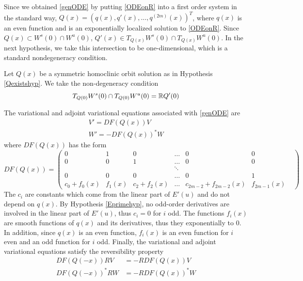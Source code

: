 \documentclass[thesis.tex]{subfiles}
\begin{document}
Since we obtained \eqref{genODE} by putting \eqref{ODEonR} into a first order system in the standard way, $Q(x) = (q(x), q'(x), \dots, q^{(2m)}(x))^T$, where $q(x)$ is an even function and is an exponentially localized solution to \eqref{ODEonR}. Since $Q(x) \subset W^s(0) \cap W^u(0)$, $Q'(x) \in T_{Q(x)}W^s(0) \cap T_{Q(x)}W^u(0)$. In the next hypothesis, we take this intersection to be one-dimensional, which is a standard nondegeneracy condition.

\begin{hypothesis}\label{nondegenhyp}
Let $Q(x)$ be a symmetric homoclinic orbit solution as in Hypothesis \ref{Qexistshyp}. We take the non-degeneracy condition
\begin{equation}
T_{Q(0)}W^s(0) \cap T_{Q(0)}W^u(0) = {\mathbb R} Q'(0)
\end{equation}
\end{hypothesis}

The variational and adjoint variational equations associated with \eqref{genODE} are
\begin{align}
V' = DF(Q(x)) V \label{vareq1} \\
W' = -DF(Q(x))^* W \label{adjvareq1}
\end{align}
where $DF(Q(x))$ has the form
\begin{equation}\label{DF}
DF(Q(x)) = \begin{pmatrix}
0 & 1 & 0 & \dots & 0 & 0 \\
0 & 0 & 1 & \dots & 0 & 0 \\
& &  & \ddots &  & & \\
0 & 0 & 0 & \dots & 0 & 1 \\
c_0 + f_0(x) & f_1(x) & c_2 + f_2(x) &
 \dots & c_{2m-2} + f_{2m-2}(x) & f_{2m-1}(x)
\end{pmatrix}
\end{equation}
The $c_i$ are constants which come from the linear part of $E'(u)$ and do not depend on $q(x)$. By Hypothesis \ref{Eprimehyp}, no odd-order derivatives are involved in the linear part of $E'(u)$, thus $c_i = 0$ for $i$ odd. The functions $f_i(x)$ are smooth functions of $q(x)$ and its derivatives, thus they exponentially to 0. In addition, since $q(x)$ is an even function, $f_i(x)$ is an even function for $i$ even and an odd function for $i$ odd. Finally, the variational and adjoint variational equations satisfy the reversibility property 
\begin{equation}\label{vareqrev}
\begin{aligned}
DF(Q(-x))RV &= -R DF(Q(x)) V \\
DF(Q(-x))^* RW &= -R DF(Q(x))^* W
\end{aligned}
\end{equation}
\end{document}
